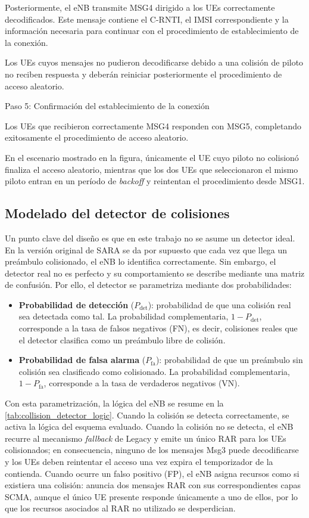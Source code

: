Posteriormente, el eNB transmite MSG4 dirigido a los UEs correctamente decodificados. Este mensaje contiene el C-RNTI, el IMSI correspondiente y la información necesaria para continuar con el procedimiento de establecimiento de la conexión.

Los UEs cuyos mensajes no pudieron decodificarse debido a una colisión de piloto no reciben respuesta y deberán reiniciar posteriormente el procedimiento de acceso aleatorio.

Paso 5: Confirmación del establecimiento de la conexión

Los UEs que recibieron correctamente MSG4 responden con MSG5, completando exitosamente el procedimiento de acceso aleatorio.

En el escenario mostrado en la figura, únicamente el UE cuyo piloto no colisionó finaliza el acceso aleatorio, mientras que los dos UEs que seleccionaron el mismo piloto entran en un período de \textit{backoff} y reintentan el procedimiento desde MSG1.


\subsection{Modelado del detector de colisiones}

Un punto clave del diseño es que en este trabajo no se asume un detector ideal. En la versión original de SARA se da por supuesto que cada vez que llega un preámbulo colisionado, el eNB lo identifica correctamente. Sin embargo, el detector real no es perfecto y su comportamiento se describe mediante una matriz de confusión. Por ello, el detector se parametriza mediante dos probabilidades:

\begin{itemize}
    \item \textbf{Probabilidad de detección} ($P_{\mathrm{det}}$): probabilidad de que una colisión real sea detectada como tal. La probabilidad complementaria, $1-P_{\mathrm{det}}$, corresponde a la tasa de falsos negativos (FN), es decir, colisiones reales que el detector clasifica como un preámbulo libre de colisión.

    \item \textbf{Probabilidad de falsa alarma} ($P_{\mathrm{fa}}$): probabilidad de que un preámbulo sin colisión sea clasificado como colisionado. La probabilidad complementaria, $1-P_{\mathrm{fa}}$, corresponde a la tasa de verdaderos negativos (VN).
\end{itemize}

Con esta parametrización, la lógica del eNB se resume en la \cref{tab:collision_detector_logic}. Cuando la colisión se detecta correctamente, se activa la lógica del esquema evaluado. Cuando la colisión no se detecta, el eNB recurre al mecanismo \textit{fallback} de Legacy y emite un único RAR para los UEs colisionados; en consecuencia, ninguno de los mensajes Msg3 puede decodificarse y los UEs deben reintentar el acceso una vez expira el temporizador de la contienda. Cuando ocurre un falso positivo (FP), el eNB asigna recursos como si existiera una colisión: anuncia dos mensajes RAR con sus correspondientes capas SCMA, aunque el único UE presente responde únicamente a uno de ellos, por lo que los recursos asociados al RAR no utilizado se desperdician.

